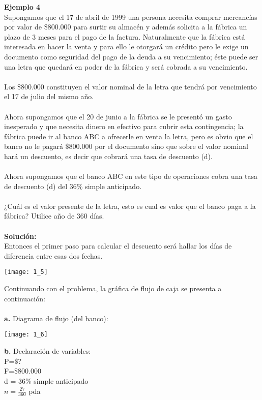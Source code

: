 \textbf{Ejemplo 4}
\\
Supongamos que el 17 de abril de 1999 una persona necesita comprar mercancías por valor de \$800.000 para surtir su almacén y además solicita a la fábrica un plazo de 3 meses para el pago de la factura. Naturalmente que la fábrica está interesada en hacer la venta y para ello le otorgará un crédito pero le exige un documento como seguridad del pago de la deuda a su vencimiento; éste puede ser una letra que quedará en poder de la fábrica y será cobrada a su vencimiento.
\\\\
Los \$800.000 constituyen el valor nominal de la letra que tendrá por vencimiento el 17 de julio del mismo año.
\\\\
Ahora supongamos que el 20 de junio a la fábrica se le presentó un gasto inesperado y que necesita dinero en efectivo para cubrir esta contingencia; la fábrica puede ir al banco ABC a ofrecerle en venta la letra, pero es obvio que el banco no le pagará \$800.000 por el documento sino que sobre el valor nominal hará un descuento, es decir que cobrará una tasa de descuento (d).
\\\\
Ahora supongamos que el banco ABC en este tipo de operaciones cobra una tasa de descuento (d) del 36\% simple anticipado.
\\\\
¿Cuál es el valor presente de la letra, esto es cual es valor que el banco paga a la fábrica? Utilice año de 360 días.
\\\\
\clearpage
\textbf{Solución:}
\\
Entonces el primer paso para calcular el descuento será hallar los días de diferencia entre esas dos fechas.
\begin{center}
\texttt{[image: 1\_5]}
\end{center}
Continuando con el problema, la gráfica de flujo de caja se presenta a continuación:
\\\\
\textbf{a. }Diagrama de flujo (del banco):
\begin{center}
\texttt{[image: 1\_6]}
\end{center}

\textbf{b.} Declaración de variables: \\
P=\$?\\
F=\$800.000\\
d = 36\% simple anticipado\\
$n=\frac{27}{360}$ pda

